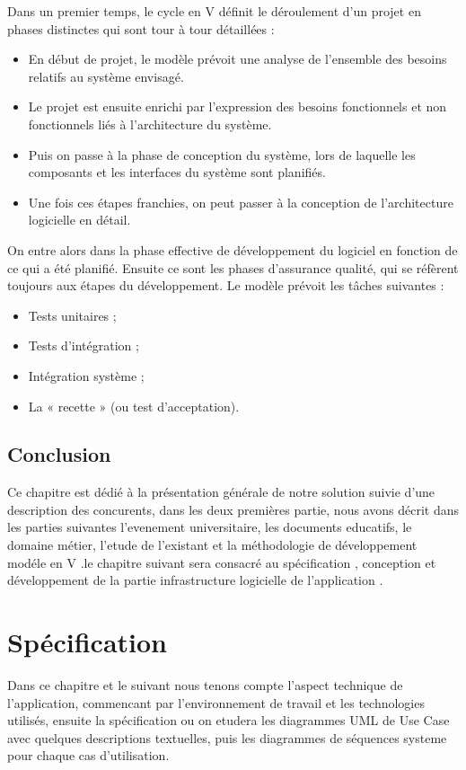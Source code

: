 \documentclass[12pt]{report}
\begin{document}
Dans un premier temps, le cycle en V définit le déroulement d’un projet en phases distinctes qui sont tour à tour détaillées :
\begin{itemize}
\item En début de projet, le modèle prévoit une analyse de l’ensemble des besoins relatifs au système envisagé.
\item Le projet est ensuite enrichi par l’expression des besoins fonctionnels et non fonctionnels liés à l’architecture du système.
\item Puis on passe à la phase de conception du système, lors de laquelle les composants et les interfaces du système sont planifiés.
\item Une fois ces étapes franchies, on peut passer à la conception de l’architecture logicielle en détail.
\end{itemize}

On entre alors dans la phase effective de développement du logiciel en fonction de ce qui a été planifié. Ensuite ce sont les phases d’assurance qualité, qui se réfèrent toujours aux étapes du développement. Le modèle prévoit les tâches suivantes :
\begin{itemize}
\item Tests unitaires ;
\item Tests d’intégration ;
\item Intégration système ;
\item La « recette » (ou test d’acceptation).
\end{itemize}




\section*{Conclusion}


Ce chapitre est dédié à la présentation générale de notre solution suivie d’une description des
concurents, dans les deux premières partie, nous avons décrit dans les parties suivantes
l'evenement universitaire, les documents educatifs, le domaine métier, l'etude de l'existant et la méthodologie de développement modéle en V .le chapitre suivant sera consacré au spécification , conception et développement de la partie infrastructure logicielle de l'application .
\newpage
\chapter{Spécification}

Dans ce chapitre et le suivant nous tenons compte l'aspect technique de l'application, commencant
par l'environnement de travail et les technologies utilisés, ensuite la spécification ou on etudera les diagrammes UML de Use Case avec quelques descriptions textuelles, puis les diagrammes de séquences systeme pour chaque cas d'utilisation.
\end{document}
